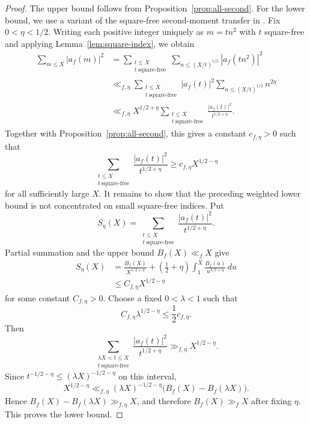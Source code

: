 \documentclass[10pt,a4paper]{amsart}
\begin{document}
\begin{proof}
The upper bound follows from Proposition~\ref{prop:all-second}. For the
lower bound, we use a variant of the square-free second-moment transfer in
\cite[Lemma~9]{LRW}. Fix $0<\eta<1/2$. Writing each positive integer
uniquely as $m=tn^2$ with $t$ square-free and applying
Lemma~\ref{lem:square-index}, we obtain
\begin{align*}
\sum_{m\leq X}|a_f(m)|^2
&=\sum_{\substack{t\leq X\\t\ \mathrm{square\text{-}free}}}
  \sum_{n\leq (X/t)^{1/2}}|a_f(tn^2)|^2\\
&\ll_{f,\eta}
  \sum_{\substack{t\leq X\\t\ \mathrm{square\text{-}free}}}
  |a_f(t)|^2\sum_{n\leq (X/t)^{1/2}}n^{2\eta}\\
&\ll_{f,\eta}X^{1/2+\eta}
  \sum_{\substack{t\leq X\\t\ \mathrm{square\text{-}free}}}
  \frac{|a_f(t)|^2}{t^{1/2+\eta}}.
\end{align*}
Together with Proposition~\ref{prop:all-second}, this gives a constant
$c_{f,\eta}>0$ such that
\[
\sum_{\substack{t\leq X\\t\ \mathrm{square\text{-}free}}}
\frac{|a_f(t)|^2}{t^{1/2+\eta}}
\geq c_{f,\eta}X^{1/2-\eta}
\]
for all sufficiently large $X$.
It remains to show that the preceding weighted lower bound is not
concentrated on small square-free indices. Put
\[
S_\eta(X)=
\sum_{\substack{t\leq X\\t\ \mathrm{square\text{-}free}}}
\frac{|a_f(t)|^2}{t^{1/2+\eta}}.
\]
Partial summation and the upper bound $B_f(X)\ll_fX$ give
\begin{align*}
S_\eta(X)
&=\frac{B_f(X)}{X^{1/2+\eta}}
 +\left(\frac12+\eta\right)
  \int_1^X\frac{B_f(u)}{u^{3/2+\eta}}\,du\\
&\leq C_{f,\eta}X^{1/2-\eta}
\end{align*}
for some constant $C_{f,\eta}>0$. Choose a fixed $0<\lambda<1$ such that
\[
C_{f,\eta}\lambda^{1/2-\eta}\leq\frac12c_{f,\eta}.
\]
Then
\[
\sum_{\substack{\lambda X<t\leq X\\t\ \mathrm{square\text{-}free}}}
\frac{|a_f(t)|^2}{t^{1/2+\eta}}
\gg_{f,\eta}X^{1/2-\eta}.
\]
Since $t^{-1/2-\eta}\leq(\lambda X)^{-1/2-\eta}$ on this interval,
\[
X^{1/2-\eta}
\ll_{f,\eta}
(\lambda X)^{-1/2-\eta}\bigl(B_f(X)-B_f(\lambda X)\bigr).
\]
Hence $B_f(X)-B_f(\lambda X)\gg_{f,\eta}X$, and therefore
$B_f(X)\gg_fX$ after fixing $\eta$. This proves the lower bound.
\end{proof}
\end{document}

